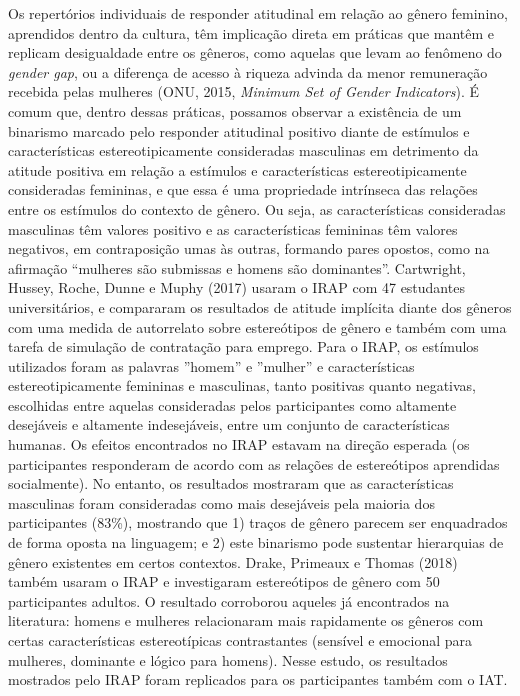 Os repertórios individuais de responder atitudinal em relação ao gênero feminino, aprendidos dentro da cultura, têm implicação direta em práticas que mantêm e replicam desigualdade entre os gêneros, como aquelas que levam ao fenômeno do \textit{gender gap}, ou a diferença de acesso à riqueza advinda da menor remuneração recebida pelas mulheres (ONU, 2015, \textit{Minimum Set of Gender Indicators}). É comum que, dentro dessas práticas, possamos observar a existência de um binarismo marcado pelo responder atitudinal positivo diante de estímulos e características estereotipicamente consideradas masculinas em detrimento da atitude positiva em relação a estímulos e características estereotipicamente consideradas femininas, e que essa é uma propriedade intrínseca das relações entre os estímulos do contexto de gênero. Ou seja, as características consideradas masculinas têm valores positivo e as características femininas têm valores negativos, em contraposição umas às outras, formando pares opostos, como na afirmação ``mulheres são submissas e homens são dominantes''. Cartwright, Hussey, Roche, Dunne e Muphy (2017) usaram o IRAP com 47 estudantes universitários, e compararam os resultados de atitude implícita diante dos gêneros com uma medida de autorrelato sobre estereótipos de gênero e também com uma tarefa de simulação de contratação para emprego. Para o IRAP, os estímulos utilizados foram as palavras ''homem'' e ''mulher'' e características estereotipicamente femininas e masculinas, tanto positivas quanto negativas, escolhidas entre aquelas consideradas pelos participantes como altamente desejáveis e altamente indesejáveis, entre um conjunto de características humanas. Os efeitos encontrados no IRAP estavam na direção esperada (os participantes responderam de acordo com as relações de estereótipos aprendidas socialmente). No entanto, os resultados mostraram que as características masculinas foram consideradas como mais desejáveis pela maioria dos participantes (83\%), mostrando que 1) traços de gênero parecem ser enquadrados de forma oposta na linguagem; e 2) este binarismo pode sustentar hierarquias de gênero existentes em certos contextos. Drake, Primeaux e Thomas (2018) também usaram o IRAP e investigaram estereótipos de gênero com 50 participantes adultos. O resultado corroborou aqueles já encontrados na literatura: homens e mulheres relacionaram mais rapidamente os gêneros com certas características estereotípicas contrastantes (sensível e emocional para mulheres, dominante e lógico para homens). Nesse estudo, os resultados mostrados pelo IRAP foram replicados para os participantes também com o IAT.

